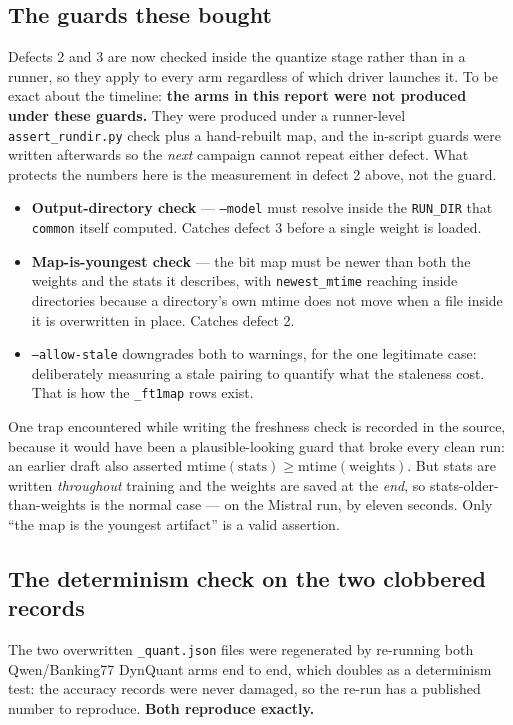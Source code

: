 \documentclass[11pt]{article}
\newcommand{\code}[1]{\texttt{#1}}
\begin{document}
\subsection{The guards these bought}

Defects 2 and 3 are now checked inside the quantize stage rather than in a runner, so they apply to
every arm regardless of which driver launches it. To be exact about the timeline: \textbf{the arms
in this report were not produced under these guards.} They were produced under a runner-level
\code{assert\_rundir.py} check plus a hand-rebuilt map, and the in-script guards were written
afterwards so the \emph{next} campaign cannot repeat either defect. What protects the numbers here
is the measurement in defect 2 above, not the guard.

\begin{itemize}[leftmargin=1.4em]
\item \textbf{Output-directory check} --- \code{--model} must resolve inside the \code{RUN\_DIR}
that \code{common} itself computed. Catches defect 3 before a single weight is loaded.
\item \textbf{Map-is-youngest check} --- the bit map must be newer than both the weights and the
stats it describes, with \code{newest\_mtime} reaching inside directories because a directory's own
mtime does not move when a file inside it is overwritten in place. Catches defect 2.
\item \code{--allow-stale} downgrades both to warnings, for the one legitimate case: deliberately
measuring a stale pairing to quantify what the staleness cost. That is how the \code{\_ft1map} rows
exist.
\end{itemize}

One trap encountered while writing the freshness check is recorded in the source, because it would
have been a plausible-looking guard that broke every clean run: an earlier draft also asserted
$\mathrm{mtime(stats)} \geq \mathrm{mtime(weights)}$. But stats are written \emph{throughout}
training and the weights are saved at the \emph{end}, so stats-older-than-weights is the normal
case --- on the Mistral run, by eleven seconds. Only ``the map is the youngest artifact'' is a
valid assertion.

\subsection{The determinism check on the two clobbered records}

The two overwritten \code{\_quant.json} files were regenerated by re-running both Qwen/Banking77
DynQuant arms end to end, which doubles as a determinism test: the accuracy records were never
damaged, so the re-run has a published number to reproduce. \textbf{Both reproduce exactly.}
\end{document}
